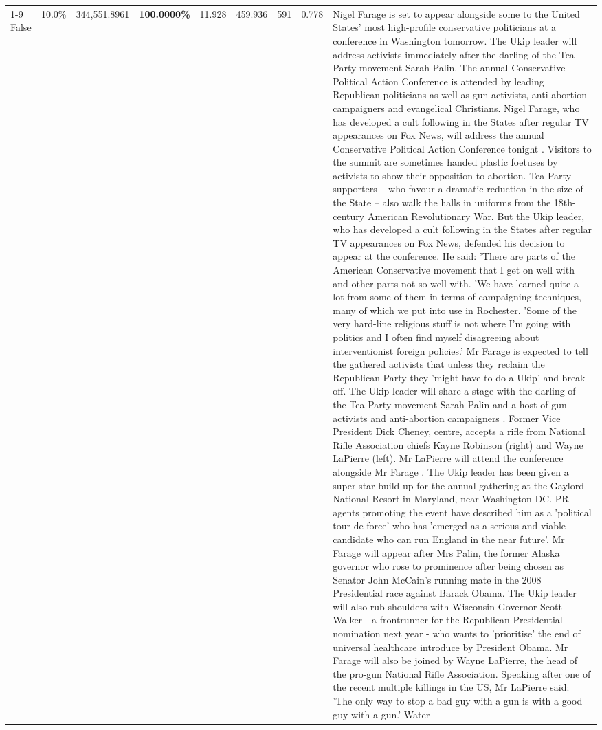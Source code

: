 \begin{table}[H]
\begin{tabular}{lllrlllll}
\cline{1-9}
False & 10.0\% & 344,551.8961 & \bfseries \color{red} 100.0000\% & 11.928 & 459.936 & 591 & 0.778 & Nigel Farage is set to appear alongside some to the United States' most high-profile conservative politicians at a conference in Washington tomorrow. The Ukip leader will address activists immediately after the darling of the Tea Party movement Sarah Palin. The annual Conservative Political Action Conference is attended by leading Republican politicians as well as gun activists, anti-abortion campaigners and evangelical Christians. Nigel Farage, who has developed a cult following in the States after regular TV appearances on Fox News, will address the annual Conservative Political Action Conference tonight . Visitors to the summit are sometimes handed plastic foetuses by activists to show their opposition to abortion. Tea Party supporters – who favour a dramatic reduction in the size of the State – also walk the halls in uniforms from the 18th-century American Revolutionary War. But the Ukip leader, who has developed a cult following in the States after regular TV appearances on Fox News, defended his decision to appear at the conference. He said: 'There are parts of the American Conservative movement that I get on well with and other parts not so well with. 'We have learned quite a lot from some of them in terms of campaigning techniques, many of which we put into use in Rochester. 'Some of the very hard-line religious stuff is not where I'm going with politics and I often find myself disagreeing about interventionist foreign policies.' Mr Farage is expected to tell the gathered activists that unless they reclaim the Republican Party they 'might have to do a Ukip' and break off. The Ukip leader will share a stage with the darling of the Tea Party movement Sarah Palin and a host of gun activists and anti-abortion campaigners . Former Vice President Dick Cheney, centre, accepts a rifle from National Rifle Association chiefs Kayne Robinson (right) and Wayne LaPierre (left). Mr LaPierre will attend the conference alongside Mr Farage . The Ukip leader has been given a super-star build-up for the annual gathering at the Gaylord National Resort in Maryland, near Washington DC. PR agents promoting the event have described him as a 'political tour de force' who has 'emerged as a serious and viable candidate who can run England in the near future'. Mr Farage will appear after Mrs Palin, the former Alaska governor who rose to prominence after being chosen as Senator John McCain's running mate in the 2008 Presidential race against Barack Obama. The Ukip leader will also rub shoulders with Wisconsin Governor Scott Walker - a frontrunner for the Republican Presidential nomination next year - who wants to 'prioritise' the end of universal healthcare introduce by President Obama. Mr Farage will also be joined by Wayne LaPierre, the head of the pro-gun National Rifle Association. Speaking after one of the recent multiple killings in the US, Mr LaPierre said: 'The only way to stop a bad guy with a gun is with a good guy with a gun.' Water \\

\end{tabular}
\end{table}
